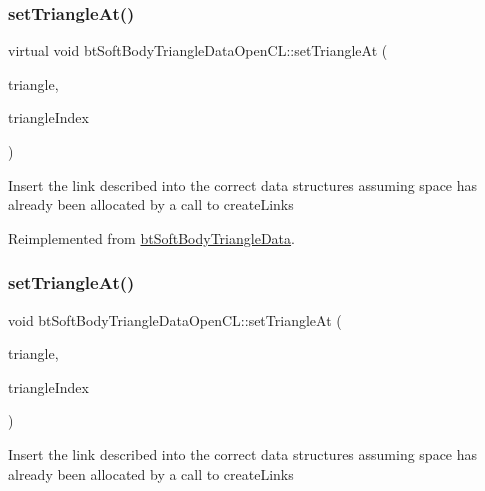 \subsubsection{\texorpdfstring{set\+Triangle\+At()}{setTriangleAt()}\hspace{0.1cm}{\footnotesize\ttfamily [1/2]}}
{\footnotesize\ttfamily virtual void bt\+Soft\+Body\+Triangle\+Data\+Open\+C\+L\+::set\+Triangle\+At (\begin{DoxyParamCaption}\item[{const \hyperlink{classbtSoftBodyTriangleData_1_1TriangleDescription}{bt\+Soft\+Body\+Triangle\+Data\+::\+Triangle\+Description} \&}]{triangle,  }\item[{int}]{triangle\+Index }\end{DoxyParamCaption})\hspace{0.3cm}{\ttfamily [virtual]}}

Insert the link described into the correct data structures assuming space has already been allocated by a call to create\+Links 

Reimplemented from \hyperlink{classbtSoftBodyTriangleData}{bt\+Soft\+Body\+Triangle\+Data}.

\mbox{\label{classbtSoftBodyTriangleDataOpenCL_ac7f551e48b59ffb15e936c3392d57953}} 
\subsubsection{\texorpdfstring{set\+Triangle\+At()}{setTriangleAt()}\hspace{0.1cm}{\footnotesize\ttfamily [2/2]}}
{\footnotesize\ttfamily void bt\+Soft\+Body\+Triangle\+Data\+Open\+C\+L\+::set\+Triangle\+At (\begin{DoxyParamCaption}\item[{const \hyperlink{classbtSoftBodyTriangleData_1_1TriangleDescription}{bt\+Soft\+Body\+Triangle\+Data\+::\+Triangle\+Description} \&}]{triangle,  }\item[{int}]{triangle\+Index }\end{DoxyParamCaption})\hspace{0.3cm}{\ttfamily [virtual]}}

Insert the link described into the correct data structures assuming space has already been allocated by a call to create\+Links 

